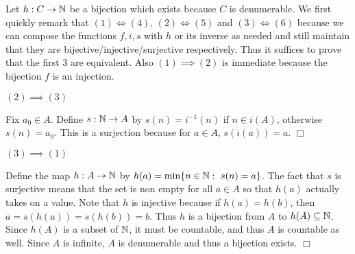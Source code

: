 \documentclass{article}
\begin{document}
 {
    Let $h: C\to \mathbb{N}$ be a bijection which exists because $C$ is denumerable. We first quickly remark that $(1)\iff (4)$, $(2)\iff (5)$ and $(3)\iff (6)$ because we can compose the functions $f,i,s$ with $h$ or its inverse as needed and still maintain that they are bijective/injective/surjective respectively. Thus it suffices to prove that the first 3 are equivalent. Also $(1)\implies (2)$ is immediate because the bijection $f$ is an injection.

    $(2)\implies (3)$

    Fix $a_{0}\in A$. Define $s:\mathbb{N}\to A$ by $s(n) = i^{-1}(n)$ if $n\in i(A)$, otherwise $s(n) = a_{0}$. This is a surjection because for $a\in A$, $s(i(a)) = a$. $\Box$

    $(3)\implies (1)$

    Define the map $h:A\to \mathbb{N}$ by $h(a) = \min\{n\in \mathbb{N}:\ s(n) = a\}$. The fact that $s$ is surjective means that the set is non empty for all $a\in A$ so that $h(a)$ actually takes on a value. Note that $h$ is injective because if $h(a) = h(b)$, then $a = s(h(a)) = s(h(b)) = b$. Thus $h$ is a bijection from $A$ to $h(A)\subseteq \mathbb{N}$. Since $h(A)$ is a subset of $\mathbb{N}$, it must be countable, and thus $A$ is countable as well. Since $A$ is infinite, $A$ is denumerable and thus a bijection exists. $\Box$
}
\end{document}
